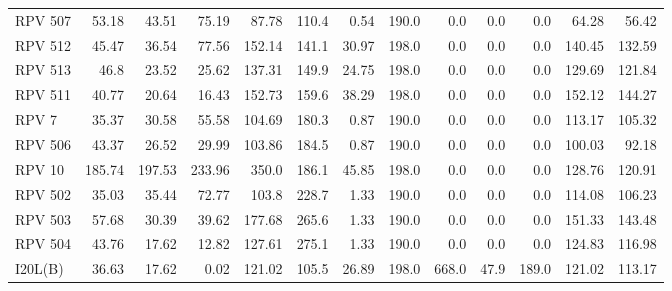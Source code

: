 \documentclass{article}
\begin{document}
\begin{table}[htb]
\begin{tabular}{lrrrrrrrrrrrr}
    RPV 507           &  53.18 &  43.51 &  75.19 &  87.78 &           110.4 &         0.54 &                      190.0 &             0.0 &          0.0 &                        0.0 &  64.28 &  56.42 \\
    RPV 512           &  45.47 &  36.54 &  77.56 & 152.14 &           141.1 &        30.97 &                      198.0 &             0.0 &          0.0 &                        0.0 & 140.45 & 132.59 \\
    RPV 513           &   46.8 &  23.52 &  25.62 & 137.31 &           149.9 &        24.75 &                      198.0 &             0.0 &          0.0 &                        0.0 & 129.69 & 121.84 \\
    RPV 511           &  40.77 &  20.64 &  16.43 & 152.73 &           159.6 &        38.29 &                      198.0 &             0.0 &          0.0 &                        0.0 & 152.12 & 144.27 \\
    RPV 7             &  35.37 &  30.58 &  55.58 & 104.69 &           180.3 &         0.87 &                      190.0 &             0.0 &          0.0 &                        0.0 & 113.17 & 105.32 \\
    RPV 506           &  43.37 &  26.52 &  29.99 & 103.86 &           184.5 &         0.87 &                      190.0 &             0.0 &          0.0 &                        0.0 & 100.03 &  92.18 \\
    RPV 10            & 185.74 & 197.53 & 233.96 &  350.0 &           186.1 &        45.85 &                      198.0 &             0.0 &          0.0 &                        0.0 & 128.76 & 120.91 \\
    RPV 502           &  35.03 &  35.44 &  72.77 &  103.8 &           228.7 &         1.33 &                      190.0 &             0.0 &          0.0 &                        0.0 & 114.08 & 106.23 \\
    RPV 503           &  57.68 &  30.39 &  39.62 & 177.68 &           265.6 &         1.33 &                      190.0 &             0.0 &          0.0 &                        0.0 & 151.33 & 143.48 \\
    RPV 504           &  43.76 &  17.62 &  12.82 & 127.61 &           275.1 &         1.33 &                      190.0 &             0.0 &          0.0 &                        0.0 & 124.83 & 116.98 \\
    I20L(B)           &  36.63 &  17.62 &   0.02 & 121.02 &           105.5 &        26.89 &                      198.0 &           668.0 &         47.9 &                      189.0 & 121.02 & 113.17 \\

\end{tabular}
\end{table}
\end{document}
